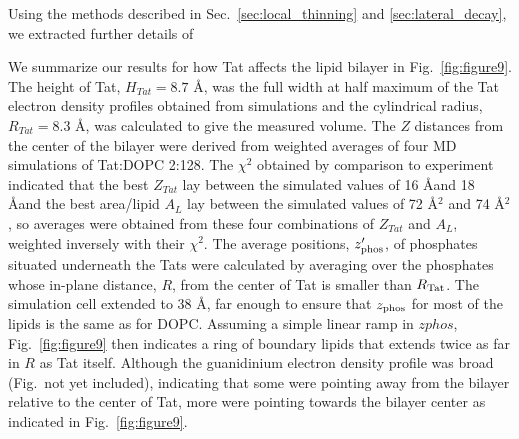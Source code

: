 Using the methods described in Sec.~\ref{sec:local_thinning} and 
\ref{sec:lateral_decay}, we extracted further details of 

We summarize our results for how Tat affects the lipid bilayer in Fig.~\ref{fig:figure9}. 
The height of Tat, $H_{Tat} = 8.7$ \AA, was the full width at half maximum of 
the Tat electron density profiles
obtained from simulations and the cylindrical radius, $R_{Tat} = 8.3$ \AA, was 
calculated to give the
measured volume. The $Z$ distances from the center of the bilayer were derived 
from weighted
averages of four MD simulations of Tat:DOPC 2:128. The $\chi^2$ obtained by 
comparison to
experiment indicated that the best $Z_{Tat}$ lay between the simulated values 
of 16 \AA and 18 \AA and
the best area/lipid $A_L$ lay between the simulated values of 72 \AA$^2$ and 
74 \AA$^2$, 
so averages were
obtained from these four combinations of $Z_{Tat}$ and $A_L$, weighted inversely 
with their $\chi^2$. The
average positions, $z_\textrm{phos}'$, of phosphates situated underneath the Tats were calculated by
averaging over the phosphates whose in-plane distance, $R$, from the center of Tat is smaller than
$R_\textrm{Tat}$. The simulation cell extended to 38 \AA, far enough to ensure that $z_\textrm{phos}$ for most of the lipids is
the same as for DOPC. Assuming a simple linear ramp in $zphos$, Fig.~\ref{fig:figure9} then indicates a ring of
boundary lipids that extends twice as far in $R$ as Tat itself. Although the guanidinium electron
density profile was broad (Fig.~not yet included), indicating that some were pointing away from the bilayer
relative to the center of Tat, more were pointing towards the bilayer center as indicated in Fig.~\ref{fig:figure9}.




